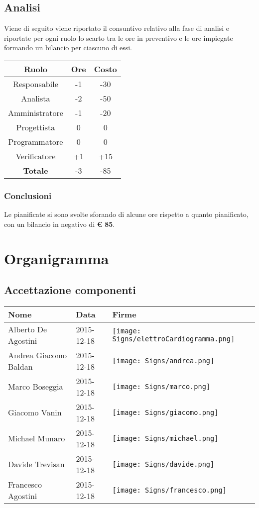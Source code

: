 \documentclass{scalatekids-article}
\begin{document}
\subsection{Analisi}
Viene di seguito viene riportato il consuntivo relativo alla fase di analisi e riportate per ogni ruolo lo
scarto tra le ore in preventivo e le ore impiegate formando un bilancio per ciascuno di essi.
\begin{center}
  \normalsize
  \begin{tabular}{| c | c | c |}
    \hline
    \textbf{Ruolo} & \textbf{Ore} & \textbf{Costo}\\
    \hline
    Responsabile & -1 & -30 \\
    Analista & -2 & -50\\
    Amministratore & -1 & -20\\
    Progettista & 0 & 0\\
    Programmatore & 0 & 0\\
    Verificatore & +1 & +15\\
    \hline
    \textbf{Totale} & -3 & -85\\
    \hline
  \end{tabular}
\end{center}

\subsubsection{Conclusioni}
Le  pianificate si sono svolte sforando di alcune ore rispetto a quanto pianificato, con un
bilancio in negativo di \textbf{\euro{} 85}.
\section{Organigramma}
\subsection{Accettazione componenti}
\begin{center}
  \begin{tabular}{|l | l | p{4cm} |}
    \hline
    Nome & Data & Firme \\
    \hline
    Alberto De Agostini & 2015-12-18 & \texttt{[image: Signs/elettroCardiogramma.png]} \\
    Andrea Giacomo Baldan & 2015-12-18 &\texttt{[image: Signs/andrea.png]} \\
    Marco Boseggia & 2015-12-18 &\texttt{[image: Signs/marco.png]} \\
    Giacomo Vanin & 2015-12-18 & \texttt{[image: Signs/giacomo.png]}\\
    Michael Munaro & 2015-12-18 &\texttt{[image: Signs/michael.png]}\\
    Davide Trevisan & 2015-12-18 &\texttt{[image: Signs/davide.png]}\\
    Francesco Agostini & 2015-12-18 &\texttt{[image: Signs/francesco.png]}\\
    \hline
  \end{tabular}
\end{center}
\end{document}
